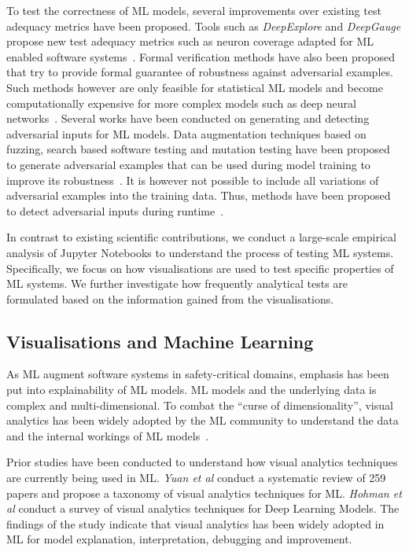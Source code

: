 To test the correctness of ML models, several improvements over
existing test adequacy metrics have been proposed. Tools such as
\textit{DeepExplore} and \textit{DeepGauge} propose new test adequacy
metrics such as neuron coverage adapted for ML enabled software
systems~\cite{pei2017deepexplore, ma2018deepgauge,
  gerasimou2020importance}. Formal verification methods have also been
proposed that try to provide formal guarantee of robustness against
adversarial examples. Such methods however are only feasible for
statistical ML models and become computationally expensive for more
complex models such as deep neural networks~\cite{zhu2021deepmemory,
  baluta2021scalable}. Several works have been conducted on generating
and detecting adversarial inputs for ML models. Data augmentation
techniques based on fuzzing, search based software testing and
mutation testing have been proposed to generate adversarial examples
that can be used during model training to improve its
robustness~\cite{braiek2019deepevolution, gao2020fuzz, wang2021robot,
  zhang2020white}. It is however not possible to include all
variations of adversarial examples into the training data. Thus,
methods have been proposed to detect adversarial inputs during
runtime~\cite{xiao2021self, wang2020dissector, wang2019adversarial,
  berend2020cats}.

In contrast to existing scientific contributions, we conduct a
large-scale empirical analysis of Jupyter Notebooks to understand the
process of testing ML systems. Specifically, we focus on how
visualisations are used to test specific properties of ML systems. We
further investigate how frequently analytical tests are formulated
based on the information gained from the visualisations.

\subsection{Visualisations and Machine Learning}\label{sec:visualisations}

As ML augment software systems in safety-critical domains, emphasis
has been put into explainability of ML models. ML models and the
underlying data is complex and multi-dimensional. To combat the
``curse of dimensionality'', visual analytics has been widely adopted
by the ML community to understand the data and the internal workings
of ML models~\cite{yuan2021survey,hohman2019visual,wexler2020if}.

Prior studies have been conducted to understand how visual analytics
techniques are currently being used in ML. \emph{Yuan et al} conduct a
systematic review of 259 papers and propose a taxonomy of visual
analytics techniques for ML. \emph{Hohman et al} conduct a survey of
visual analytics techniques for Deep Learning Models. The findings of
the study indicate that visual analytics has been widely adopted in ML
for model explanation, interpretation, debugging and improvement.

